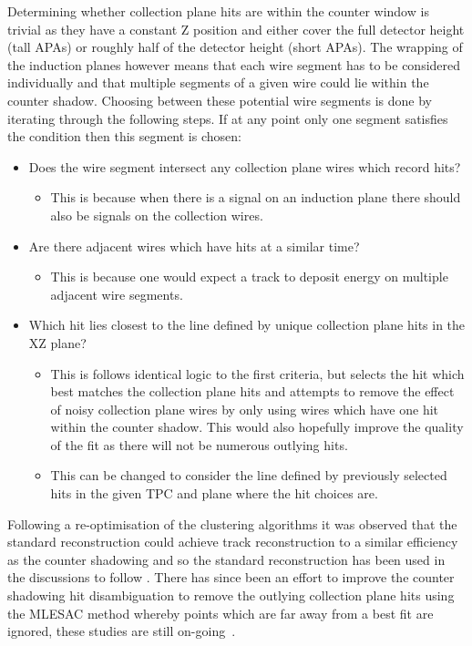 Determining whether collection plane hits are within the counter window is trivial as they have a constant Z position and either cover the full detector height (tall APAs) or roughly half of the detector height (short APAs). The wrapping of the induction planes however means that each wire segment has to be considered individually and that multiple segments of a given wire could lie within the counter shadow. Choosing between these potential wire segments is done by iterating through the following steps. If at any point only one segment satisfies the condition then this segment is chosen:
\begin{itemize}
\item Does the wire segment intersect any collection plane wires which record hits?
  \begin{itemize}
  \item This is because when there is a signal on an induction plane there should also be signals on the collection wires.
  \end{itemize}
\item Are there adjacent wires which have hits at a similar time?
  \begin{itemize}
  \item This is because one would expect a track to deposit energy on multiple adjacent wire segments. 
  \end{itemize}
\item Which hit lies closest to the line defined by unique collection plane hits in the XZ plane?
  \begin{itemize}
  \item This is follows identical logic to the first criteria, but selects the hit which best matches the collection plane hits and attempts to remove the effect of noisy collection plane wires by only using wires which have one hit within the counter shadow. This would also hopefully improve the quality of the fit as there will not be numerous outlying hits.
  \item This can be changed to consider the line defined by previously selected hits in the given TPC and plane where the hit choices are.
  \end{itemize}
\end{itemize}

Following a re-optimisation of the clustering algorithms it was observed that the standard reconstruction could achieve track reconstruction to a similar efficiency as the counter shadowing and so the standard reconstruction has been used in the discussions to follow \citep{TingjunClustering}. There has since been an effort to improve the counter shadowing hit disambiguation to remove the outlying collection plane hits using the MLESAC method \citep{MLESAC} whereby points which are far away from a best fit are ignored, these studies are still on-going~\citep{MattMLESAC}. \\

